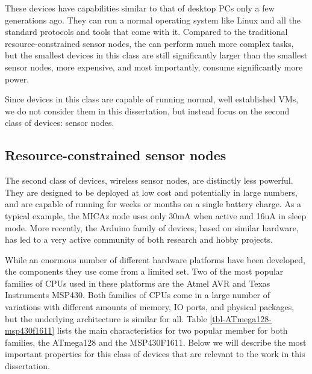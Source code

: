 These devices have capabilities similar to that of desktop PCs only a few generations ago. They can run a normal operating system like Linux and all the standard protocols and tools that come with it. Compared to the traditional resource-constrained sensor nodes, the can perform much more complex tasks, but the smallest devices in this class are still significantly larger than the smallest sensor nodes, more expensive, and most importantly, consume significantly more power.

Since devices in this class are capable of running normal, well established VMs, we do not consider them in this dissertation, but instead focus on the second class of devices: sensor nodes.

\subsection{Resource-constrained sensor nodes}
The second class of devices, wireless sensor nodes, are distinctly less powerful. They are designed to be deployed at low cost and potentially in large numbers, and are capable of running for weeks or months on a single battery charge. As a typical example, the MICAz node \cite{CrossbowTechnology} uses only 30mA when active and 16uA in sleep mode. More recently, the Arduino family of devices, based on similar hardware, has led to a very active community of both research and hobby projects.

While an enormous number of different hardware platforms have been developed, the components they use come from a limited set. Two of the most popular families of CPUs used in these platforms are the Atmel AVR and Texas Instruments MSP430. Both families of CPUs come in a large number of variations with different amounts of memory, IO ports, and physical packages, but the underlying architecture is similar for all. Table \ref{tbl-ATmega128-msp430f1611} lists the main characteristics for two popular member for both families, the ATmega128 and the MSP430F1611. Below we will describe the most important properties for this class of devices that are relevant to the work in this dissertation.

